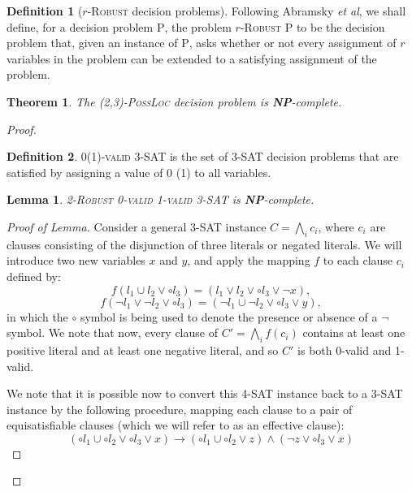 \documentclass[reprint]{revtex4-1}
\newtheorem{thm}{Theorem}
\newtheorem{lem}{Lemma}
\theoremstyle{definition}
\newtheorem{defn}{Definition}
\begin{document}
\begin{defn}[$r$-\textsc{Robust} decision problems]	
Following Abramsky \emph{et al}, we shall define, for a decision problem \textsc{P}, the problem $r$-\textsc{Robust P} to be the decision problem that, given an instance of \textsc{P}, asks whether or not every assignment of $r$ variables in the problem can be extended to a satisfying assignment of the problem.
\end{defn}

\begin{thm}
The \textsc{(2,3)-PossLoc} decision problem is \textbf{NP}-complete.
\end{thm}
\begin{proof}
\begin{defn}
\textsc{0(1)-valid 3-SAT} is the set of \textsc{3-SAT} decision problems that are satisfied by assigning a value of 0 (1) to all variables.
\end{defn}

\begin{lem}\label{rob3sat}
\textsc{2-Robust 0-valid 1-valid 3-SAT} is \textbf{NP}-complete.
\end{lem}
\begin{proof}[Proof of Lemma]
Consider a general \textsc{3-SAT} instance $C=\bigwedge_i c_i$, where $c_i$ are clauses consisting of the disjunction of three literals or negated literals. We will introduce two new variables $x$ and $y$, and apply the mapping $f$ to each clause $c_i$ defined by:
\begin{equation}
f(l_1\cup l_2 \vee  \circ  l_3) = (l_1\vee l_2 \vee \circ l_3 \vee \neg x),
\end{equation}
\begin{equation}
f(\neg l_1\vee\neg l_2 \vee \circ  l_3) = (\neg l_1\cup\neg l_2 \vee \circ  l_3 \vee  y),
\end{equation}
in which the $\circ$ symbol is being used to denote the presence or absence of a $\neg$ symbol. We note that now, every clause of $C'=\bigwedge_i f(c_i)$ contains at least one positive literal and at least one negative literal, and so $C'$ is both 0-valid and 1-valid.

We note that it is possible now to convert this 4-SAT instance back to a \textsc{3-SAT} instance by the following procedure, mapping each clause to a pair of equisatisfiable clauses (which we will refer to as an effective clause):
\begin{equation}
(\circ l_1\cup\circ l_2 \vee  \circ  l_3 \vee x) \rightarrow (\circ l_1\cup\circ l_2 \vee z)\wedge(\neg z \vee \circ  l_3 \vee x)
\end{equation}


\end{proof}
\end{proof}
\end{document}
